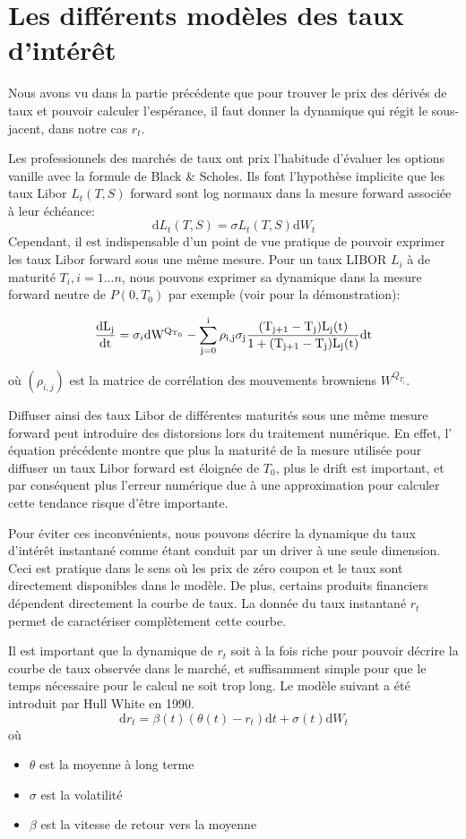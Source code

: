 
\chapter{Les différents modèles des taux d'intérêt}

Nous avons vu dans la partie précédente que pour trouver le prix des dérivés de taux et pouvoir calculer l'espérance, il faut donner la dynamique qui régit le sous-jacent, dans notre cas  $r_t$.

Les professionnels des marchés de taux ont prix l'habitude d'évaluer les options vanille avec la formule de Black \& Scholes. Ils font l'hypothèse implicite que les taux Libor $L_t(T, S)$ forward sont log normaux dans la mesure forward associée à leur échéance:
$$\mathrm{d} L_t(T, S) = \sigma L_t(T, S) \mathrm{d}W_t$$
Cependant, il est indispensable d'un point de vue pratique de pouvoir exprimer les taux Libor forward sous une même mesure. Pour un taux LIBOR $L_i$ à de maturité $T_i, i=1...n$, nous pouvons exprimer sa dynamique dans la mesure forward neutre de $P(0, T_0)$ par  exemple (voir \cite{Central} pour la démonstration):

$$ \frac{\rm{d}L_j}{\rm{d}t} =  \sigma_i \rm{d}W^{Q_{T_0}}  - \sum_{j=0}^i \rho_{i,j} \sigma_j \frac{(T_{j+1} - T_j) L_j(t)}{1+(T_{j+1} - T_j) L_j(t) } \rm{d}t $$

où $(\rho_{i, j})$ est la matrice de corrélation des mouvements browniens $W^{Q_{T_i}}$.

Diffuser ainsi des taux Libor de différentes maturités sous une même mesure forward peut introduire des distorsions lors du traitement numérique. En effet, l' équation précédente montre que plus la maturité de la mesure utilisée pour diffuser un taux Libor forward est  éloignée de $T_0$, plus le drift est important, et par conséquent plus l’erreur numérique due à une approximation pour calculer cette tendance risque d’être importante.

Pour éviter ces inconvénients, nous pouvons décrire la dynamique du taux d'intérêt instantané comme étant conduit par un driver à une seule dimension. Ceci est pratique dans le sens où les prix de zéro coupon et le taux sont directement disponibles dans le modèle.
De plus, certains produits financiers dépendent directement la courbe de taux.
La donnée du taux instantané $r_t$ permet de caractériser complètement cette courbe.

Il est important que la dynamique de $r_t$ soit à la fois riche pour pouvoir décrire la courbe de taux observée dans le marché, et suffisamment simple pour que le temps nécessaire pour le calcul ne soit trop long. Le modèle suivant a été introduit par Hull White  en 1990.
$$ \mathrm{d}r_t =   \beta(t) (\theta(t) - r_t) \mathrm{d}t + \sigma(t) \mathrm{d} W_t$$
où 
\begin{itemize}
\item $\theta$ est la moyenne à long terme
\item $\sigma$ est la volatilité
\item $\beta$ est la vitesse de retour vers la moyenne
\end{itemize}

